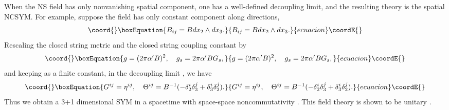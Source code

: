 \documentclass[a4paper,12pt]{article}
\begin{document}
When the NS \coordHE{} field has only nonvanishing spatial component, one has a
well-defined decoupling limit, and the resulting theory is the spatial
NCSYM. For example, suppose the \coordHE{} field has only constant
component along \coordHE{} directions,
\begin{equation}\coord{}\boxEquation{
B_{ij}=B dx_2\wedge dx_3.
}{
B_{ij}=B dx_2\wedge dx_3.
}{ecuacion}\coordE{}\end{equation}
Rescaling the closed string metric \coordHE{} and the closed string coupling
constant \coordHE{} by
\begin{equation}\coord{}\boxEquation{
\label{ncsym}
g=(2\pi \alpha' B)^2,\ \ \
g_s=2\pi \alpha'B G_s,
}{
g=(2\pi \alpha' B)^2,\ \ \
g_s=2\pi \alpha'B G_s,
}{ecuacion}\coordE{}\end{equation}
and keeping \coordHE{} as a finite constant, in the decoupling limit \coordHE{},
we have
\begin{equation}\coord{}\boxEquation{
G^{ij}=\eta^{ij}, \ \ \ \Theta^{ij}=B^{-1}(-\delta^i_2\delta^j_3
 +\delta^i_3\delta^j_2).
}{
G^{ij}=\eta^{ij}, \ \ \ \Theta^{ij}=B^{-1}(-\delta^i_2\delta^j_3
 +\delta^i_3\delta^j_2).
}{ecuacion}\coordE{}\end{equation}
Thus we obtain a 3+1 dimensional SYM in a spacetime with space-space
noncommutativity \coordHE{}. This field theory is shown to be
unitary \cite{Gomi}.
\end{document}
